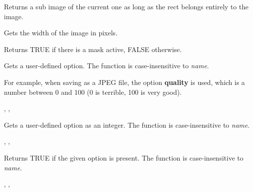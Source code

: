 Returns a sub image of the current one as long as the rect belongs entirely to 
the image.

\label{wximagegetwidth}


Gets the width of the image in pixels.



\label{wximagehasmask}


Returns TRUE if there is a mask active, FALSE otherwise.

\label{wximagegetoption}


Gets a user-defined option. The function is case-insensitive to {\it name}.

For example, when saving as a JPEG file, the option {\bf quality} is
used, which is a number between 0 and 100 (0 is terrible, 100 is very good).


,\rtfsp
{},\rtfsp
{}

\label{wximagegetoptionint}


Gets a user-defined option as an integer. The function is case-insensitive to {\it name}.


,\rtfsp
{},\rtfsp
{}

\label{wximagehasoption}


Returns TRUE if the given option is present. The function is case-insensitive to {\it name}.


,\rtfsp
{},\rtfsp
{}


